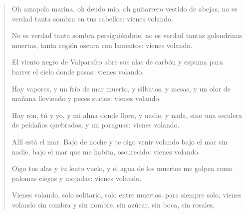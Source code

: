 \documentclass[12pt]{article}
\begin{document}
\begin{verse}
Oh amapola marina, oh deudo mío,  
oh guitarrero vestido de abejas,  
no es verdad tanta sombra en tus cabellos:  
vienes volando.  
	
No es verdad tanta sombra persiguiéndote,  
no es verdad tantas golondrinas muertas,  
tanta región oscura con lamentos:  
vienes volando.  
	
El viento negro de Valparaíso  
abre sus alas de carbón y espuma  
para barrer el cielo donde pasas:  
vienes volando.  
	
Hay vapores, y un frío de mar muerto,  
y silbatos, y mesas, y un olor  
de mañana lloviendo y peces sucios:  
vienes volando.  
	
Hay ron, tú y yo, y mi alma donde lloro,  
y nadie, y nada, sino una escalera  
de peldaños quebrados, y un paraguas:  
vienes volando.  
	
Allí está el mar. Bajo de noche y te oigo  
venir volando bajo el mar sin nadie,  
bajo el mar que me habita, oscurecido:  
vienes volando.  
	
Oigo tus alas y tu lento vuelo,  
y el agua de los muertos me golpea  
como palomas ciegas y mojadas:  
vienes volando.  
	
Vienes volando, solo solitario,  
solo entre muertos, para siempre solo,  
vienes volando sin sombra y sin nombre,  
sin azúcar, sin boca, sin rosales,  

\end{verse}
\end{document}
